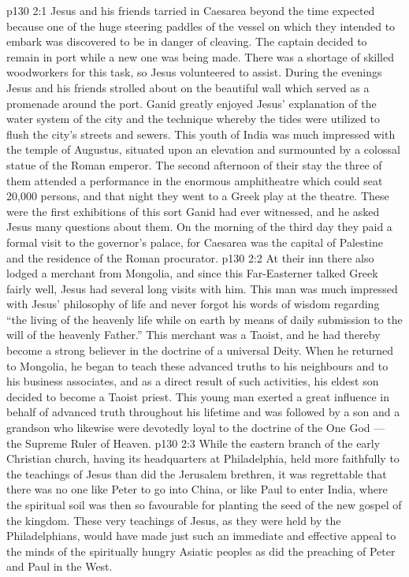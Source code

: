 \vs p130 2:1 Jesus and his friends tarried in Caesarea beyond the time expected because one of the huge steering paddles of the vessel on which they intended to embark was discovered to be in danger of cleaving. The captain decided to remain in port while a new one was being made. There was a shortage of skilled woodworkers for this task, so Jesus volunteered to assist. During the evenings Jesus and his friends strolled about on the beautiful wall which served as a promenade around the port. Ganid greatly enjoyed Jesus’ explanation of the water system of the city and the technique whereby the tides were utilized to flush the city’s streets and sewers. This youth of India was much impressed with the temple of Augustus, situated upon an elevation and surmounted by a colossal statue of the Roman emperor. The second afternoon of their stay the three of them attended a performance in the enormous amphitheatre which could seat 20,000 persons, and that night they went to a Greek play at the theatre. These were the first exhibitions of this sort Ganid had ever witnessed, and he asked Jesus many questions about them. On the morning of the third day they paid a formal visit to the governor’s palace, for Caesarea was the capital of Palestine and the residence of the Roman procurator.
\vs p130 2:2 \pc At their inn there also lodged a merchant from Mongolia, and since this Far\hyp{}Easterner talked Greek fairly well, Jesus had several long visits with him. This man was much impressed with Jesus’ philosophy of life and never forgot his words of wisdom regarding “the living of the heavenly life while on earth by means of daily submission to the will of the heavenly Father.” This merchant was a Taoist, and he had thereby become a strong believer in the doctrine of a universal Deity. When he returned to Mongolia, he began to teach these advanced truths to his neighbours and to his business associates, and as a direct result of such activities, his eldest son decided to become a Taoist priest. This young man exerted a great influence in behalf of advanced truth throughout his lifetime and was followed by a son and a grandson who likewise were devotedly loyal to the doctrine of the One God --- the Supreme Ruler of Heaven.
\vs p130 2:3 While the eastern branch of the early Christian church, having its headquarters at Philadelphia, held more faithfully to the teachings of Jesus than did the Jerusalem brethren, it was regrettable that there was no one like Peter to go into China, or like Paul to enter India, where the spiritual soil was then so favourable for planting the seed of the new gospel of the kingdom. These very teachings of Jesus, as they were held by the Philadelphians, would have made just such an immediate and effective appeal to the minds of the spiritually hungry Asiatic peoples as did the preaching of Peter and Paul in the West.
